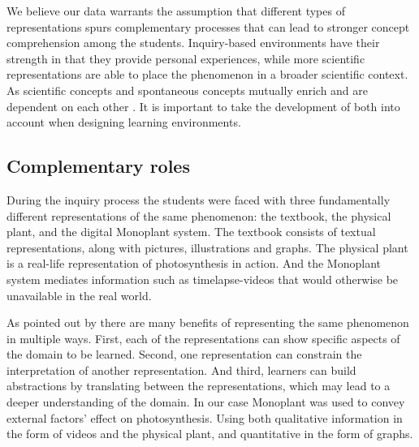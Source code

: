 We believe our data warrants the assumption that different types of representations spurs complementary processes that can lead to stronger concept comprehension among the students. Inquiry-based environments have their strength in that they provide personal experiences, while more scientific representations are able to place the phenomenon in a broader scientific context. As scientific concepts and spontaneous concepts mutually enrich and are dependent on each other \citep{vygotsky2012thought}. It is important to take the development of both into account when designing learning environments. 




\subsection{Complementary roles}
During the inquiry process the students were faced with three fundamentally different representations of the same phenomenon: the textbook, the physical plant, and the digital Monoplant system. The textbook consists of textual representations, along with pictures, illustrations and graphs. The physical plant is a real-life representation of photosynthesis in action. And the Monoplant system mediates information such as timelapse-videos that would otherwise be unavailable in the real world. 

As pointed out by \citet{van2006supporting} there are many benefits of representing the same phenomenon in multiple ways. First, each of the representations can show specific aspects of the domain to be learned. Second, one representation can constrain the interpretation of another representation. And third, learners can build abstractions by translating between the representations, which may lead to a deeper understanding of the domain. In our case Monoplant was used to convey external factors' effect on photosynthesis. Using both qualitative information in the form of videos and the physical plant, and quantitative in the form of graphs. 

